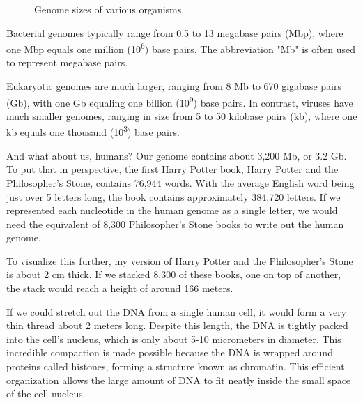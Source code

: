 \begin{figure}
    \caption[6pt]{Genome sizes of various organisms.}
    \label{fig:g-genome-size}
  \end{figure}

Bacterial genomes typically range from 0.5 to 13 megabase pairs (Mbp), where one Mbp equals one million (10\textsuperscript{6}) base pairs. The abbreviation "Mb" is often used to represent megabase pairs.

Eukaryotic genomes are much larger, ranging from 8 Mb to 670 gigabase pairs (Gb), with one Gb equaling one billion (10\textsuperscript{9}) base pairs. In contrast, viruses have much smaller genomes, ranging in size from 5 to 50 kilobase pairs (kb), where one kb equals one thousand (10\textsuperscript{3}) base pairs.

And what about us, humans? Our genome contains about 3,200 Mb, or 3.2 Gb. To put that in perspective, the first Harry Potter book, Harry Potter and the Philosopher's Stone, contains 76,944 words. With the average English word being just over 5 letters long, the book contains approximately 384,720 letters. If we represented each nucleotide in the human genome as a single letter, we would need the equivalent of 8,300 Philosopher's Stone books to write out the human genome.

To visualize this further, my version of Harry Potter and the Philosopher's Stone is about 2 cm thick. If we stacked 8,300 of these books, one on top of another, the stack would reach a height of around 166 meters.

If we could stretch out the DNA from a single human cell, it would form a very thin thread about 2 meters long. Despite this length, the DNA is tightly packed into the cell's nucleus, which is only about 5-10 micrometers in diameter. This incredible compaction is made possible because the DNA is wrapped around proteins called histones, forming a structure known as chromatin. This efficient organization allows the large amount of DNA to fit neatly inside the small space of the cell nucleus.

